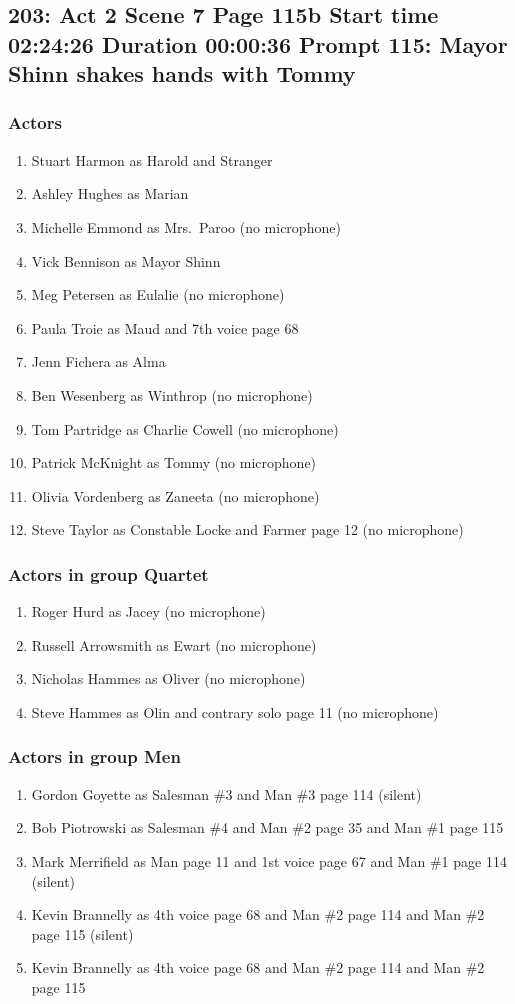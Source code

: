 \subsection{203: Act 2 Scene 7 Page 115b Start time 02:24:26 Duration 00:00:36 Prompt 115: Mayor Shinn shakes hands with Tommy}

\subsubsection{Actors}
\begin{enumerate}
\item Stuart Harmon as Harold and Stranger
\item Ashley Hughes as Marian
\item Michelle Emmond as Mrs.~Paroo (no microphone)
\item Vick Bennison as Mayor Shinn
\item Meg Petersen as Eulalie (no microphone)
\item Paula Troie as Maud and 7th voice page 68
\item Jenn Fichera as Alma
\item Ben Wesenberg as Winthrop (no microphone)
\item Tom Partridge as Charlie Cowell (no microphone)
\item Patrick McKnight as Tommy (no microphone)
\item Olivia Vordenberg as Zaneeta (no microphone)
\item Steve Taylor as Constable Locke and Farmer page 12 (no microphone)
\end{enumerate}
\subsubsection{Actors in group Quartet}
\begin{enumerate}
\item Roger Hurd as Jacey (no microphone)
\item Russell Arrowsmith as Ewart (no microphone)
\item Nicholas Hammes as Oliver (no microphone)
\item Steve Hammes as Olin and contrary solo page 11 (no microphone)
\end{enumerate}
\subsubsection{Actors in group Men}
\begin{enumerate}
\item Gordon Goyette as Salesman \#3 and Man \#3 page 114 (silent)
\item Bob Piotrowski as Salesman \#4 and Man \#2 page 35 and Man \#1 page 115
\item Mark Merrifield as Man page 11 and 1st voice page 67 and Man \#1 page 114 (silent)
\item Kevin Brannelly as 4th voice page 68 and Man \#2 page 114 and Man \#2 page 115 (silent)
\item Kevin Brannelly as 4th voice page 68 and Man \#2 page 114 and Man \#2 page 115
\end{enumerate}
